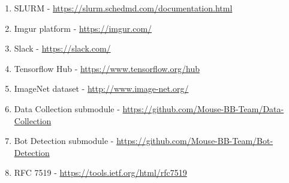 \begin{enumerate}
    \item SLURM - \url{https://slurm.schedmd.com/documentation.html}\label{itm:slurm}
    \item Imgur platform - \url{https://imgur.com/}\label{itm:imgur}
    \item Slack - \url{https://slack.com/}\label{itm:slack}
    \item Tensorflow Hub - \url{https://www.tensorflow.org/hub}\label{itm:tensorflow-hub}
    \item ImageNet dataset - \url{http://www.image-net.org/}\label{itm:image-net}
    \item Data Collection submodule - \url{https://github.com/Mouse-BB-Team/Data-Collection}\label{itm:data-collection}
    \item Bot Detection submodule - \url{https://github.com/Mouse-BB-Team/Bot-Detection}\label{itm:bot-detection}
    \item RFC 7519 - \url{https://tools.ietf.org/html/rfc7519}\label{itm:rfc-jwt}
\end{enumerate}
